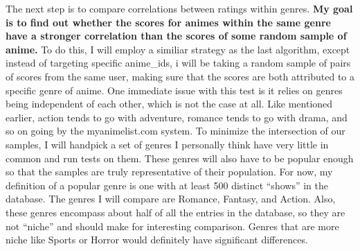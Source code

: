 \documentclass[
]{article}
\begin{document}
The next step is to compare correlations between ratings within genres.
\textbf{My goal is to find out whether the scores for animes within the
same genre have a stronger correlation than the scores of some random
sample of anime. } To do this, I will employ a similiar strategy as the
last algorithm, except instead of targeting specific anime\_ids, i will
be taking a random sample of pairs of scores from the same user, making
sure that the scores are both attributed to a specific genre of anime.
One immediate issue with this test is it relies on genres being
independent of each other, which is not the case at all. Like mentioned
earlier, action tends to go with adventure, romance tends to go with
drama, and so on going by the myanimelist.com system. To minimize the
intersection of our samples, I will handpick a set of genres I
personally think have very little in common and run tests on them. These
genres will also have to be popular enough so that the samples are truly
representative of their population. For now, my definition of a popular
genre is one with at least 500 distinct ``shows'' in the database. The
genres I will compare are Romance, Fantasy, and Action. Also, these
genres encompass about half of all the entries in the database, so they
are not ``niche'' and should make for interesting comparison. Genres
that are more niche like Sports or Horror would definitely have
significant differences.
\end{document}
